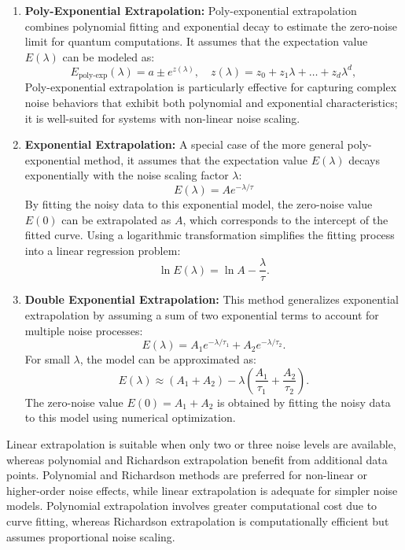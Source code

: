 \documentclass[12pt]{article}
\begin{document}
\begin{enumerate}
    \item \textbf{Poly-Exponential Extrapolation:} Poly-exponential extrapolation combines polynomial fitting and exponential decay to estimate the zero-noise limit for quantum computations. It assumes that the expectation value \( E(\lambda) \) can be modeled as:
    \[
    E_{\text{poly-exp}}(\lambda) = a \pm e^{z(\lambda)}, \quad z(\lambda) = z_0 + z_1 \lambda + \dots + z_d \lambda^d, \tag{17} \label{eq:17}
    \]
    Poly-exponential extrapolation is particularly effective for capturing complex noise behaviors that exhibit both polynomial and exponential characteristics; it is well-suited for systems with non-linear noise scaling.

    \item \textbf{Exponential Extrapolation:} A special case of the more general poly-exponential method, it assumes that the expectation value \( E(\lambda) \) decays exponentially with the noise scaling factor \( \lambda \):
    \[
    E(\lambda) = A e^{-\lambda / \tau} \tag{18} \label{eq:18}
    \]
    By fitting the noisy data to this exponential model, the zero-noise value \( E(0) \) can be extrapolated as \( A \), which corresponds to the intercept of the fitted curve. Using a logarithmic transformation simplifies the fitting process into a linear regression problem:
    \[
    \ln E(\lambda) = \ln A - \frac{\lambda}{\tau}. \tag{18.1} \label{eq:18.1}
    \]

    \item \textbf{Double Exponential Extrapolation:} This method generalizes exponential extrapolation by assuming a sum of two exponential terms to account for multiple noise processes:
    \[
    E(\lambda) = A_1 e^{-\lambda / \tau_1} + A_2 e^{-\lambda / \tau_2}.
    \]
    For small \( \lambda \), the model can be approximated as:
    \[
    E(\lambda) \approx (A_1 + A_2) - \lambda \left( \frac{A_1}{\tau_1} + \frac{A_2}{\tau_2} \right).
    \]
    The zero-noise value \( E(0) = A_1 + A_2 \) is obtained by fitting the noisy data to this model using numerical optimization.
    
\end{enumerate}

Linear extrapolation is suitable when only two or three noise levels are available, whereas polynomial and Richardson extrapolation benefit from additional data points. Polynomial and Richardson methods are preferred for non-linear or higher-order noise effects, while linear extrapolation is adequate for simpler noise models. Polynomial extrapolation involves greater computational cost due to curve fitting, whereas Richardson extrapolation is computationally efficient but assumes proportional noise scaling.
\end{document}

